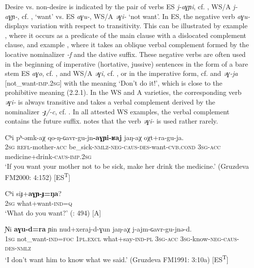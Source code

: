 \documentclass[output=paper,colorlinks,citecolor=brown]{langscibook}
\begin{document}
Desire vs. non-desire is indicated by the pair of verbs ES \textit{j-aɣɲi}, cf. ,\textbf{ }WS/A \textit{j-aɣɲ-}, cf. , ‘want’ vs.\textbf{ }ES \textit{aɣu-}, WS/A \textit{əɣi-} ‘not want’. In ES, the negative verb \textit{aɣu-} displays variation with respect to transitivity. This can be illustrated by example , where it occurs as a predicate of the main clause with a dislocated complement clause, and example , where it takes an oblique verbal complement formed by the locative nominalizer \textit{-f} and the dative suffix. These negative verbs are often used in the beginning of imperative (hortative, jussive) sentences in the form of a bare stem ES \textit{aɣo}, cf. , and WS/A \textit{əɣi}, cf. , or in the imperative form, cf.  and \textit{əɣ-ja} [not\_want-\textsc{imp.2sg}] with the meaning ‘Don’t do it!’, which is close to the prohibitive meaning (2.2.1). In the WS and A varieties, the corresponding verb \textit{əɣi-} is always transitive and takes a verbal complement derived by the nominalizer \textit{-ɟ/-c}, cf. . In all attested WS examples, the verbal complement contains the future suffix. \citet[163]{Panfilov1965} notes that the verb \textit{əɣi-} is used rather rarely.


\ea\label{ex:niv:74}
    \gll Cʰi pʰ-əmk-aχ qo-ŋ-ɢavr-gu-jn\textbf{{}-aɣɲi-ʁaj} jaŋ-aχ oχt+ra-gu-ja. \\ 
         \textsc{2sg} \textsc{refl-}mother-\textsc{acc} be\_sick-\textsc{nmlz-neg-caus-des}{}-want-\textsc{cvb.cond} \textsc{3sg}{}-\textsc{acc} medicine+drink-\textsc{caus-imp.2sg} \\
    \glt ‘If you want your mother not to be sick, make her drink the medicine.’ (Gruzdeva FM2000: 4:152) [ES\textsuperscript{T}]
\z 

\ea\label{ex:niv:75}
    \gll Cʰi siɟ+\textbf{aɣɲ{}-ɟ=ŋa}? \\ 
         2\textsc{sg} what+want-\textsc{ind=q} \\
    \glt ‘What do you want?’ (\citealt{SaveljevaTaksami1970}: 494) [A]
\z 

\ea\label{ex:niv:76}
    \gll Ɲi \textbf{aɣu-d=ra} ɲin nud+xeraj-d-ɣun jaŋ-aχ j-ajm-ɢavr-gu-jnə-d.\\ 
         \textsc{1sg} not\_want-\textsc{ind=foc} 1\textsc{pl.excl} what+say-\textsc{ind-pl} \textsc{3sg}{}-\textsc{acc} \textsc{3sg}{}-know-\textsc{neg-caus-des-nmlz}\\
    \glt ‘I don’t want him to know what we said.’ (Gruzdeva FM1991: 3:10a) [ES\textsuperscript{T}]
\z 
\end{document}

